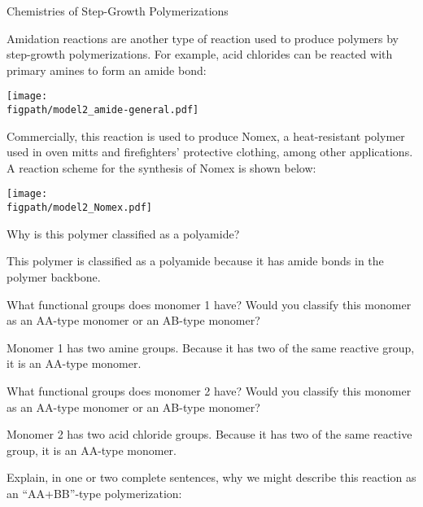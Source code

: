 \begin{activity}{Chemistries of Step-Growth Polymerizations}
\begin{ctqs}
\begin{enumerate}
		\end{enumerate}
		
\end{ctqs}
	

\clearpage
\begin{model}
\label{\labelbase:mdl:polyamide}

Amidation reactions are another type of reaction used to produce polymers by step-growth polymerizations.
For example, acid chlorides can be reacted with primary amines to form an amide bond:
	
	\centerline{\texttt{[image: \\figpath/model2\_amide-general.pdf]}}

Commercially, this reaction is used to produce Nomex, a heat-resistant polymer used in oven mitts and firefighters' protective clothing, among other applications.
A reaction scheme for the synthesis of Nomex is shown below:
	
	\centerline{\texttt{[image: \\figpath/model2\_Nomex.pdf]}}

\end{model}

\begin{ctqs}
		\question Why is this polymer classified as a polyamide?
			
				\begin{solution}[1.5in]
					This polymer is classified as a polyamide because it has amide bonds in the polymer backbone.
				\end{solution}
		
		\question What functional groups does monomer 1 have?   Would you classify this monomer as an AA-type monomer or an AB-type monomer?
			
				\begin{solution}[0.75in]
					Monomer 1 has two amine groups.  Because it has two of the same reactive group, it is an AA-type monomer.
				\end{solution}
		
		\question What functional groups does monomer 2 have?   Would you classify this monomer as an AA-type monomer or an AB-type monomer?
			
				\begin{solution}[0.75in]
					Monomer 2 has two acid chloride groups.  Because it has two of the same reactive group, it is an AA-type monomer.
				\end{solution}
		
		\question Explain, in one or two complete sentences, why we might describe this reaction as an ``AA+BB''-type polymerization:
			

\end{ctqs}
\end{activity}
